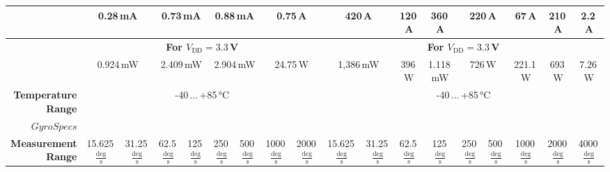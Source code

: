 \documentclass[fontsize=11pt,%
twoside,%
BCOR          = 8mm, %
DIV           = 11,  %
titlepage     = off,%
index=totoc,%
xcolor        = pdftex,%
dvipsnames,%
bibliography  = totoc,%
bibliography = numbered, %
listof        = notnumbered]{scrreprt}
\begin{document}
\begin{table}
\begin{adjustbox}{width=1.05\textwidth}
\begin{tabular}{|r||c|c|c|c|c|c|c|c||c|c|c|c|c|c|c|c|c|}
			& \multicolumn{2}{c|}{0.28\,mA} & \multicolumn{2}{c|}{0.73\,mA} & \multicolumn{2}{c|}{0.88\,mA} & \multicolumn{2}{c||}{0.75\,\textmu A} & \multicolumn{2}{c|}{420\,\textmu A} & 120\,\textmu A & 360\,\textmu A & \multicolumn{2}{c|}{220\,\textmu A} & 67\,\textmu A & 210\,\textmu A & 2.2\,\textmu A \\ \hline
			
			\multirowcell{2}{\textbf{Power Consumption}} & \multicolumn{8}{c||}{\textbf{For $V_\text{DD}=3.3\,$V}} & \multicolumn{9}{c|}{\textbf{For $V_\text{DD}=3.3\,$V}}\\ \cline{2-18}
			
			& \multicolumn{2}{c|}{0.924\,mW} & \multicolumn{2}{c|}{2.409\,mW} & \multicolumn{2}{c|}{2.904\,mW} & \multicolumn{2}{c||}{24.75\,\textmu W} & \multicolumn{2}{c|}{1,386\,mW} & 396\,\textmu W & 1.118\,mW & \multicolumn{2}{c|}{726\,\textmu W} & 221.1\,\textmu W & 693\,\textmu W & 7.26\,\textmu W \\ \hline
			
			\textbf{Temperature Range} & \multicolumn{8}{c||}{-40\,...\,+85\,°C} & \multicolumn{9}{c|}{-40\,...\,+85\,°C}\\ \hline\hline 
			
			\rowcolor{light grey} $Gyro Specs$ & \multicolumn{17}{c|}{} \\ \hline\hline
			
			\textbf{Measurement Range} & 15.625\,$\frac{\text{deg}}{\text{s}}$ & 31.25\,$\frac{\text{deg}}{\text{s}}$ & 62.5\,$\frac{\text{deg}}{\text{s}}$ & 125\,$\frac{\text{deg}}{\text{s}}$ & 250\,$\frac{\text{deg}}{\text{s}}$ & 500\,$\frac{\text{deg}}{\text{s}}$ & 1000\,$\frac{\text{deg}}{\text{s}}$ & 2000\,$\frac{\text{deg}}{\text{s}}$ & 15.625\,$\frac{\text{deg}}{\text{s}}$ & 31.25\,$\frac{\text{deg}}{\text{s}}$ & 62.5\,$\frac{\text{deg}}{\text{s}}$ & 125\,$\frac{\text{deg}}{\text{s}}$ & 250\,$\frac{\text{deg}}{\text{s}}$ & 500\,$\frac{\text{deg}}{\text{s}}$ & 1000\,$\frac{\text{deg}}{\text{s}}$ & 2000\,$\frac{\text{deg}}{\text{s}}$ & 4000\,$\frac{\text{deg}}{\text{s}}$ \\ \hline
			

\end{tabular}
\end{adjustbox}
\end{table}
\end{document}
